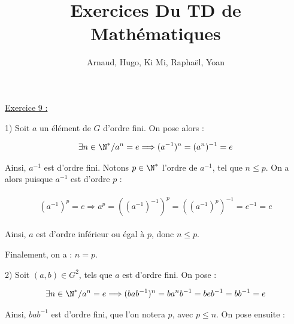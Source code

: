 \documentclass{article}
\title{Exercices Du TD de Mathématiques}
\author{Arnaud, Hugo, Ki Mi, Raphaël, Yoan}
\begin{document}
\maketitle

\underline{Exercice 9 :}

1) Soit $a$ un élément de $G$ d'ordre fini. On pose alors :

\begin{align*}\begin{split}
\exists n\in\N^*/a^n=e \Longrightarrow (a^{-1})^n=(a^n)^{-1}=e
\end{split}\end{align*}

Ainsi, $a^{-1}$ est d'ordre fini. Notons $p\in\N^*$ l'ordre de $a^{-1}$, tel que $\boxed{n\leq p}$. On a alors puisque $a^{-1}$ est d'ordre $p$ :

\begin{align*}\begin{split}
(a^{-1})^p=e \Longrightarrow a^p=((a^{-1})^{-1})^p=((a^{-1})^p)^{-1}=e^{-1}=e
\end{split}\end{align*}

Ainsi, $a$ est d'ordre inférieur ou égal à $p$, donc $\boxed{n\leq p}$.

Finalement, on a : $\boxed{n=p}$.

\bigskip

2) Soit $(a, b)\in G^2$, tels que $a$ est d'ordre fini. On pose :

\begin{align*}\begin{split}
\exists n\in\N^*/a^n=e \Longrightarrow (bab^{-1})^n = ba^nb^{-1}=beb^{-1}=bb^{-1}=e 
\end{split}\end{align*}

Ainsi, $bab^{-1}$ est d'ordre fini, que l'on notera $p$, avec $\boxed{p\leq n}$.
On pose ensuite :
\end{document}
